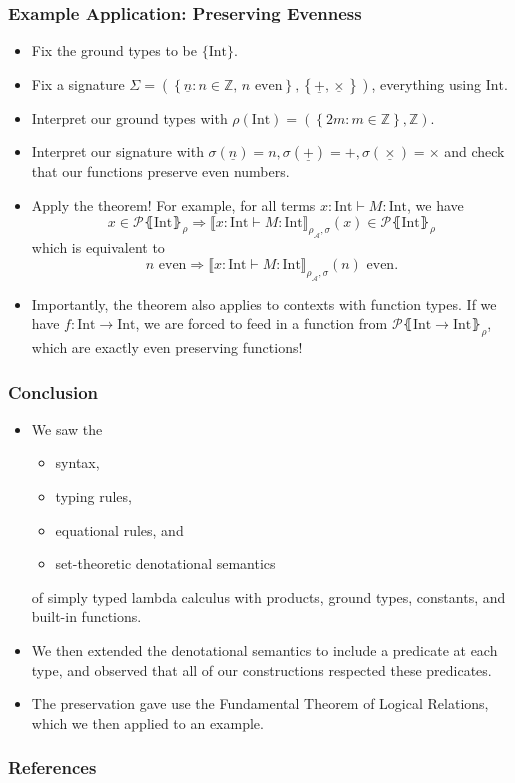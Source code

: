 \documentclass[aspectratio=169]{beamer}
\begin{document}
\begin{frame}
\frametitle{Example Application: Preserving Evenness}

\begin{itemize}
    \item Fix the ground types to be $\{\text{Int}\}$.
    \pause
    \item Fix a signature $\Sigma = \left(\left\{\underline{n} : n \in \mathbb{Z},\, n \text{ even}\right\}, \left\{\underline{+}, \underline{\times}\right\}\right)$, everything using $\text{Int}$.
    \pause
    \item Interpret our ground types with $\rho(\text{Int}) = \left(\left\{2m : m \in \mathbb{Z}\right\}, \mathbb{Z}\right)$.
    \pause
    \item Interpret our signature with $\sigma\left(\underline{n}\right) = n, \sigma\left(\underline{+}\right) = +, \sigma\left(\underline{\times}\right) = \times$ and check that our functions preserve even numbers.
    \pause
    \item Apply the theorem! For example, for all terms $x : \text{Int} \vdash M : \text{Int}$, we have
    \[
    x \in \mathcal{P}\lBrace \text{Int} \rBrace_\rho \Rightarrow \llbracket x : \text{Int} \vdash M : \text{Int} \rrbracket_{\rho_{\mathcal{A}}, \sigma}(x) \in \mathcal{P}\lBrace \text{Int} \rBrace_\rho
    \]
    which is equivalent to
    \[
    n \text{ even} \Rightarrow \llbracket x : \text{Int} \vdash M : \text{Int} \rrbracket_{\rho_{\mathcal{A}}, \sigma}(n) \text{ even}.
    \]
    \pause
    \item Importantly, the theorem also applies to contexts with function types.
    If we have $f : \text{Int} \to \text{Int}$, we are forced to feed in a function from $\mathcal{P}\lBrace \text{Int} \to \text{Int} \rBrace_\rho$, which are exactly even preserving functions!
\end{itemize}

\end{frame}

\begin{frame}
\frametitle{Conclusion}

\begin{itemize}
    \item We saw the
    \begin{itemize}
        \item syntax,
        \item typing rules,
        \item equational rules, and
        \item set-theoretic denotational semantics
    \end{itemize}
     of simply typed lambda calculus with products, ground types, constants, and built-in functions.
    \item We then extended the denotational semantics to include a predicate at each type, and observed that all of our constructions respected these predicates.
    \item The preservation gave use the Fundamental Theorem of Logical Relations, which we then applied to an example.
\end{itemize}
\end{frame}

\begin{frame}
\frametitle{References}

\printbibliography
\end{frame}
\end{document}
